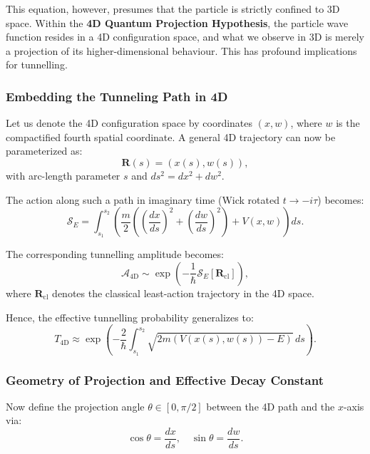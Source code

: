 \documentclass[12pt]{article}
\begin{document}
This equation, however, presumes that the particle is strictly confined to 3D space. Within the \textbf{4D Quantum Projection Hypothesis}, the particle wave function resides in a 4D configuration space, and what we observe in 3D is merely a projection of its higher-dimensional behaviour. This has profound implications for tunnelling.

\subsubsection*{Embedding the Tunneling Path in 4D}

Let us denote the 4D configuration space by coordinates \( (x, w) \), where \( w \) is the compactified fourth spatial coordinate. A general 4D trajectory can now be parameterized as:
\begin{equation}
\mathbf{R}(s) = \left(x(s), w(s)\right),
\label{eq:trajectory}
\end{equation}
with arc-length parameter \( s \) and \( ds^2 = dx^2 + dw^2 \).

The action along such a path in imaginary time (Wick rotated \( t \to -i\tau \)) becomes:
\begin{equation}
\mathcal{S}_{E} = \int_{s_1}^{s_2} \left( \frac{m}{2} \left( \left( \frac{dx}{ds} \right)^2 + \left( \frac{dw}{ds} \right)^2 \right) + V(x, w) \right) ds.
\label{eq:euclidean_action}
\end{equation}

The corresponding tunnelling amplitude becomes:
\begin{equation}
\mathcal{A}_{\text{4D}} \sim \exp\left( -\frac{1}{\hbar} \mathcal{S}_{E}[\mathbf{R}_{\text{cl}}] \right),
\label{eq:amplitude_4d}
\end{equation}
where \( \mathbf{R}_{\text{cl}} \) denotes the classical least-action trajectory in the 4D space.

Hence, the effective tunnelling probability generalizes to:
\begin{equation}
T_{\text{4D}} \approx \exp\left( -\frac{2}{\hbar} \int_{s_1}^{s_2} \sqrt{2m \left( V(x(s), w(s)) - E \right)} \, ds \right).
\label{eq:tunneling_prob_4d}
\end{equation}

\subsubsection*{Geometry of Projection and Effective Decay Constant}

Now define the projection angle \( \theta \in [0, \pi/2] \) between the 4D path and the \( x \)-axis via:
\begin{equation}
\cos\theta = \frac{dx}{ds}, \quad \sin\theta = \frac{dw}{ds}.
\label{eq:projection_angle}
\end{equation}
\end{document}
